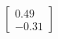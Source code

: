 \documentclass[preview]{standalone}
\begin{document}
\begin{align*}
\begin{bmatrix} 0.49 \\ -0.31 \end{bmatrix}
\end{align*}
\end{document}
